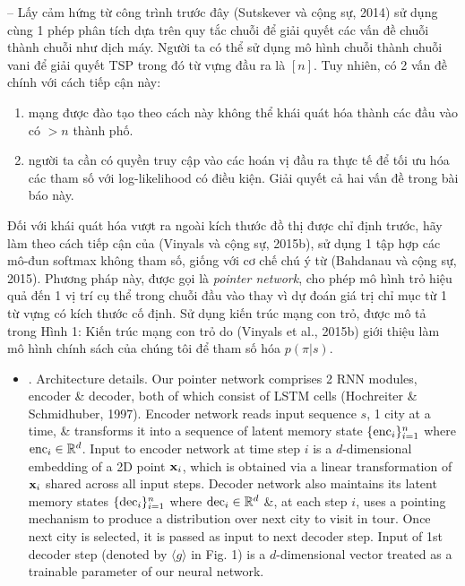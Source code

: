\documentclass{article}
\begin{document}
\begin{itemize}
    -- Lấy cảm hứng từ công trình trước đây (Sutskever và cộng sự, 2014) sử dụng cùng 1 phép phân tích dựa trên quy tắc chuỗi để giải quyết các vấn đề chuỗi thành chuỗi như dịch máy. Người ta có thể sử dụng mô hình chuỗi thành chuỗi vani để giải quyết TSP trong đó từ vựng đầu ra là $[n]$. Tuy nhiên, có 2 vấn đề chính với cách tiếp cận này:
    \begin{enumerate}
        \item mạng được đào tạo theo cách này không thể khái quát hóa thành các đầu vào có $> n$ thành phố.
        \item người ta cần có quyền truy cập vào các hoán vị đầu ra thực tế để tối ưu hóa các tham số với log-likelihood có điều kiện. Giải quyết cả hai vấn đề trong bài báo này.
    \end{enumerate}
    Đối với khái quát hóa vượt ra ngoài kích thước đồ thị được chỉ định trước, hãy làm theo cách tiếp cận của (Vinyals và cộng sự, 2015b), sử dụng 1 tập hợp các mô-đun softmax không tham số, giống với cơ chế chú ý từ (Bahdanau và cộng sự, 2015). Phương pháp này, được gọi là {\it pointer network}, cho phép mô hình trỏ hiệu quả đến 1 vị trí cụ thể trong chuỗi đầu vào thay vì dự đoán giá trị chỉ mục từ 1 từ vựng có kích thước cố định. Sử dụng kiến trúc mạng con trỏ, được mô tả trong {\sf Hình 1: Kiến trúc mạng con trỏ do (Vinyals et al., 2015b) giới thiệu} làm mô hình chính sách của chúng tôi để tham số hóa $p(\pi|s)$.
    \begin{itemize}
        \item {. Architecture details.} Our pointer network comprises 2 RNN modules, encoder \& decoder, both of which consist of LSTM cells (Hochreiter \& Schmidhuber, 1997). Encoder network reads input sequence $s$, 1 city at a time, \& transforms it into a sequence of latent memory state $\{{\rm enc}_i\}_{i=1}^n$ where ${\rm enc}_i\in\mathbb{R}^d$. Input to encoder network at time step $i$ is a $d$-dimensional embedding of a 2D point ${\bf x}_i$, which is obtained via a linear transformation of ${\bf x}_i$ shared across all input steps. Decoder network also maintains its latent memory states $\{{\rm dec}_i\}_{i=1}^n$ where ${\rm dec}_i\in\mathbb{R}^d$ \&, at each step $i$, uses a pointing mechanism to produce a distribution over next city to visit in tour. Once next city is selected, it is passed as input to next decoder step. Input of 1st decoder step (denoted by $\langle g\rangle$ in Fig. 1) is a $d$-dimensional vector treated as a trainable parameter of our neural network.
        

\end{itemize}
\end{itemize}
\end{document}
